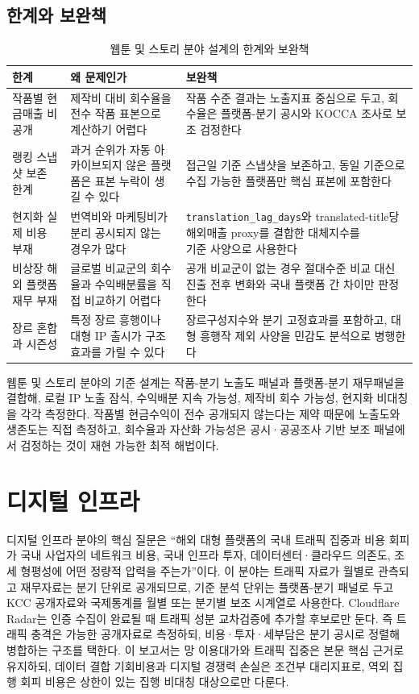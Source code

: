 \documentclass[11pt,a4paper]{report}
\newcommand{\WrapCell}[1]{\parbox[t]{\hsize}{\RaggedRight #1}}
\begin{document}
\subsection{한계와 보완책}
\begin{table}[H]
  \centering
  \small
  \caption{웹툰 및 스토리 분야 설계의 한계와 보완책}\label{tab:webtoon_limitations}
  \begin{tabular}{p{4.1cm}p{4.8cm}p{4.1cm}}
    \toprule
    \rowcolor{ReportTableHead}
    한계 & 왜 문제인가 & 보완책 \\
    \midrule
    작품별 현금매출 비공개 & 제작비 대비 회수율을 전수 작품 표본으로 계산하기 어렵다 & 작품 수준 결과는 노출지표 중심으로 두고, 회수율은 플랫폼-분기 공시와 KOCCA 조사로 보조 검정한다 \\
    랭킹 스냅샷 보존 한계 & 과거 순위가 자동 아카이브되지 않은 플랫폼은 표본 누락이 생길 수 있다 & 접근일 기준 스냅샷을 보존하고, 동일 기준으로 수집 가능한 플랫폼만 핵심 표본에 포함한다 \\
    현지화 실제 비용 부재 & 번역비와 마케팅비가 분리 공시되지 않는 경우가 많다 & \WrapCell{\texttt{translation\_lag\_days}와 translated-title당\\해외매출 proxy를 결합한 대체지수를\\기준 사양으로 사용한다} \\
    비상장 해외 플랫폼 재무 부재 & 글로벌 비교군의 회수율과 수익배분률을 직접 비교하기 어렵다 & 공개 비교군이 없는 경우 절대수준 비교 대신 진출 전후 변화와 국내 플랫폼 간 차이만 판정한다 \\
    장르 혼합과 시즌성 & 특정 장르 흥행이나 대형 IP 출시가 구조효과를 가릴 수 있다 & 장르구성지수와 분기 고정효과를 포함하고, 대형 흥행작 제외 사양을 민감도 분석으로 병행한다 \\
    \bottomrule
  \end{tabular}
\end{table}

웹툰 및 스토리 분야의 기준 설계는 작품-분기 노출도 패널과 플랫폼-분기 재무패널을 결합해, 로컬 IP 노출 잠식, 수익배분 지속 가능성, 제작비 회수 가능성, 현지화 비대칭을 각각 측정한다. 작품별 현금수익이 전수 공개되지 않는다는 제약 때문에 노출도와 생존도는 직접 측정하고, 회수율과 자산화 가능성은 공시·공공조사 기반 보조 패널에서 검정하는 것이 재현 가능한 최적 해법이다.

\section{디지털 인프라}
디지털 인프라 분야의 핵심 질문은 ``해외 대형 플랫폼의 국내 트래픽 집중과 비용 회피가 국내 사업자의 네트워크 비용, 국내 인프라 투자, 데이터센터·클라우드 의존도, 조세 형평성에 어떤 정량적 압력을 주는가''이다. 이 분야는 트래픽 자료가 월별로 관측되고 재무자료는 분기 단위로 공개되므로, 기준 분석 단위는 플랫폼-분기 패널로 두고 KCC 공개자료와 국제통계를 월별 또는 분기별 보조 시계열로 사용한다. Cloudflare Radar는 인증 수집이 완료될 때 트래픽 성분 교차검증에 추가할 후보로만 둔다. 즉 트래픽 충격은 가능한 공개자료로 측정하되, 비용·투자·세부담은 분기 공시로 정렬해 병합하는 구조를 택한다. 이 보고서는 망 이용대가와 트래픽 집중은 본문 핵심 근거로 유지하되, 데이터 결합 기회비용과 디지털 경쟁력 손실은 조건부 대리지표로, 역외 집행 회피 비용은 상한이 있는 집행 비대칭 대상으로만 다룬다.
\end{document}
